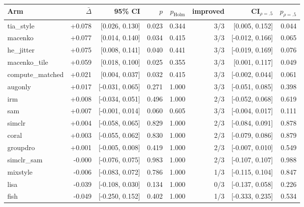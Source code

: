 \begin{tabular}{lrrrrrrr}
\toprule
Arm & $\bar\Delta$ & 95\% CI & $p$ & $p_\text{Holm}$ & improved & CI$_{\rho=.5}$ & $p_{\rho=.5}$ \\
\midrule
tia\_style & +0.078 & [0.026, 0.130] & 0.023 & 0.344 & 3/3 & [0.005, 0.152] & 0.044 \\
macenko & +0.077 & [0.014, 0.140] & 0.034 & 0.415 & 3/3 & [-0.012, 0.166] & 0.065 \\
he\_jitter & +0.075 & [0.008, 0.141] & 0.040 & 0.441 & 3/3 & [-0.019, 0.169] & 0.076 \\
macenko\_tile & +0.059 & [0.018, 0.100] & 0.025 & 0.355 & 3/3 & [0.001, 0.117] & 0.049 \\
compute\_matched & +0.021 & [0.004, 0.037] & 0.032 & 0.415 & 3/3 & [-0.002, 0.044] & 0.061 \\
augonly & +0.017 & [-0.031, 0.065] & 0.271 & 1.000 & 3/3 & [-0.051, 0.085] & 0.398 \\
irm & +0.008 & [-0.034, 0.051] & 0.496 & 1.000 & 2/3 & [-0.052, 0.068] & 0.619 \\
sam & +0.007 & [-0.001, 0.014] & 0.060 & 0.605 & 3/3 & [-0.004, 0.017] & 0.111 \\
simclr & +0.004 & [-0.058, 0.065] & 0.829 & 1.000 & 2/3 & [-0.084, 0.091] & 0.878 \\
coral & +0.003 & [-0.055, 0.062] & 0.830 & 1.000 & 2/3 & [-0.079, 0.086] & 0.879 \\
groupdro & +0.001 & [-0.005, 0.008] & 0.419 & 1.000 & 2/3 & [-0.007, 0.010] & 0.549 \\
simclr\_sam & -0.000 & [-0.076, 0.075] & 0.983 & 1.000 & 2/3 & [-0.107, 0.107] & 0.988 \\
mixstyle & -0.006 & [-0.083, 0.072] & 0.786 & 1.000 & 1/3 & [-0.115, 0.104] & 0.847 \\
lisa & -0.039 & [-0.108, 0.030] & 0.134 & 1.000 & 0/3 & [-0.137, 0.058] & 0.226 \\
fish & -0.049 & [-0.250, 0.152] & 0.402 & 1.000 & 1/3 & [-0.333, 0.235] & 0.534 \\
\bottomrule
\end{tabular}
